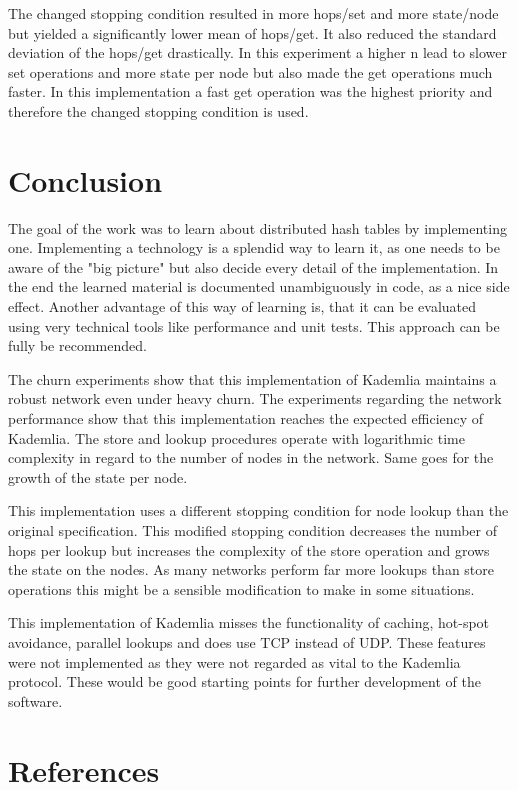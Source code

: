 \documentclass[a4paper, 12pt]{article} %
\begin{document}
The changed stopping condition resulted in more hops/set and more state/node but yielded a significantly lower mean of hops/get. It also reduced the standard deviation of the hops/get drastically. In this experiment a higher n lead to slower set operations and more state per node but also made the get operations much faster. In this implementation a fast get operation was the highest priority and therefore the changed stopping condition is used.

\newpage
\section{Conclusion}


The goal of the work was to learn about distributed hash tables by implementing one. Implementing a technology is a splendid way to learn it, as one needs to be aware of the "big picture" but also decide every detail of the implementation. In the end the learned material is documented unambiguously in code, as a nice side effect. Another advantage of this way of learning is, that it can be evaluated using very technical tools like performance and unit tests. This approach can be fully be recommended.


The churn experiments show that this implementation of Kademlia maintains a robust network even under heavy churn. The experiments regarding the network performance show that this implementation reaches the expected efficiency of Kademlia. The store and lookup procedures operate with logarithmic time complexity in regard to the number of nodes in the network. Same goes for the growth of the state per node. 


This implementation uses a different stopping condition for node lookup than the original specification. This modified stopping condition decreases the number of hops per lookup but increases the complexity of the store operation and grows the state on the nodes. As many networks perform far more lookups than store operations this might be a sensible modification to make in some situations. 


This implementation of Kademlia misses the functionality of caching, hot-spot avoidance, parallel lookups and does use TCP instead of UDP. These features were not implemented as they were not regarded as vital to the Kademlia protocol. These would be good starting points for further development of the software.


\newpage
\section{References}
\printbibliography[heading=none]
\end{document}
